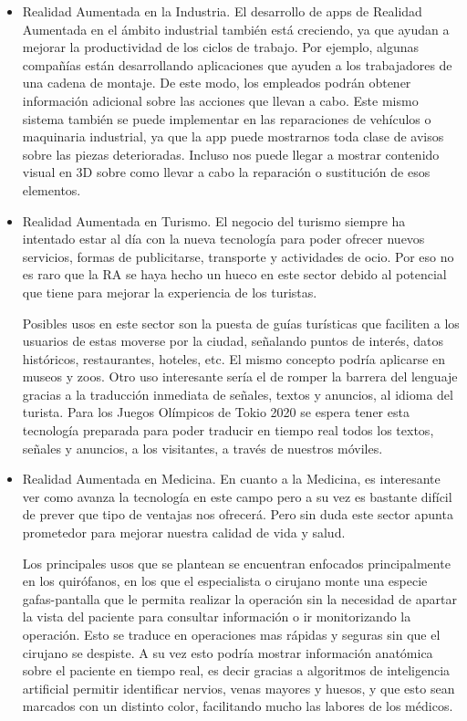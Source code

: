 \begin{itemize}
	\item Realidad Aumentada en la Industria. El desarrollo de apps de Realidad Aumentada en el ámbito industrial también está creciendo, ya que ayudan a mejorar la productividad de los ciclos de trabajo. Por ejemplo, algunas compañías están desarrollando aplicaciones que ayuden a los trabajadores de una cadena de montaje. De este modo, los empleados podrán obtener información adicional sobre las acciones que llevan a cabo. Este mismo sistema también se puede implementar en las reparaciones de vehículos o maquinaria industrial, ya que la app puede mostrarnos toda clase de avisos sobre las piezas deterioradas. Incluso nos puede llegar a mostrar contenido visual en 3D sobre como llevar a cabo la reparación o sustitución de esos elementos. 
	

	\item Realidad Aumentada en Turismo. El negocio del turismo siempre ha intentado estar al día con la nueva tecnología para poder ofrecer nuevos servicios, formas de publicitarse, transporte y actividades de ocio. Por eso no es raro que la RA se haya hecho un hueco en este sector debido al potencial que tiene para mejorar la experiencia de los turistas. 
	
	Posibles usos en este sector son la puesta de guías turísticas que faciliten a los usuarios de estas moverse por la ciudad, señalando puntos de interés, datos históricos, restaurantes, hoteles, etc. El mismo concepto podría aplicarse en museos y zoos. Otro uso interesante sería el de romper la barrera del lenguaje gracias a la traducción inmediata de señales, textos y anuncios, al idioma del turista. Para los Juegos Olímpicos de Tokio 2020 se espera tener esta tecnología preparada para poder traducir en tiempo real todos los textos, señales y anuncios, a los visitantes, a través de nuestros móviles.   

	

	\item Realidad Aumentada en Medicina. En cuanto a la Medicina, es interesante ver como avanza la tecnología en este campo pero a su vez es bastante difícil de prever que tipo de ventajas nos ofrecerá. Pero sin duda este sector apunta prometedor para mejorar nuestra calidad de vida y salud.
	
	Los principales usos que se plantean se encuentran enfocados principalmente en los quirófanos, en los que el especialista o cirujano monte una especie gafas-pantalla que le permita realizar la operación sin la necesidad de apartar la vista del paciente para consultar información o ir monitorizando la operación. Esto se traduce en operaciones mas rápidas y seguras sin que el cirujano se despiste. A su vez esto podría mostrar información anatómica sobre el paciente en tiempo real, es decir gracias a algoritmos de inteligencia artificial permitir identificar nervios, venas mayores y huesos, y que esto sean marcados con un distinto color, facilitando mucho las labores de los médicos.

\end{itemize}



